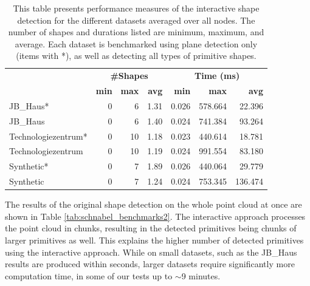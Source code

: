 \begin{table}[h]
    \centering
    \begin{tabular}{ l || r | r | r || r | r | r}
            &\multicolumn{3}{c||}{\textbf{\#Shapes}} & \multicolumn{3}{c}{\textbf{Time (ms)}}\\
            &\textbf{min} & \textbf{max} & \textbf{avg}  & \textbf{min} & \textbf{max} & \textbf{avg}  \\
            \hline
            JB\_Haus*           & 0 & 6  & 1.31 & 0.026 & 578.664 &  22.396 \\
            JB\_Haus            & 0 & 6  & 1.40 & 0.024 & 741.384 &  93.264 \\
            Technologiezentrum* & 0 & 10 & 1.18 & 0.023 & 440.614 &  18.781 \\
            Technologiezentrum  & 0 & 10 & 1.19 & 0.024 & 991.554 &  83.180 \\
            Synthetic*          & 0 & 7  & 1.89 & 0.026 & 440.064 &  29.779 \\
            Synthetic           & 0 & 7  & 1.24 & 0.024 & 753.345 & 136.474 \\
        \end{tabular}
    \caption[Interactive shape detection performance measures for different datasets]
        {This table presents performance measures of the interactive shape detection for the different datasets averaged over all nodes. The number of shapes and durations listed are minimum, maximum, and average. Each dataset is benchmarked using plane detection only (items with *), as well as detecting all types of primitive shapes. }
\label{table:schnabel_benchmarks}
\end{table}

The results of the original shape detection on the whole point cloud at once are shown in Table \ref{tab:schnabel_benchmarks2}. The interactive approach processes the point cloud in chunks, resulting in the detected primitives being chunks of larger primitives as well. This explains the higher number of detected primitives using the interactive approach. While on small datasets, such as the JB\_Haus results are produced within seconds, larger datasets require significantly more computation time, in some of our tests up to $\sim$9 minutes. 

